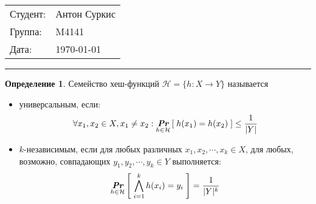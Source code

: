 \documentclass{article}
\begin{document}
    \theoremstyle{definition}
    \newtheorem*{definition}{Определение}
    \newtheorem{theorem}{Теорема}
    \newtheorem{statement}{Утверждение}
    \newtheorem{lemma}{Лемма}

    \newcommand{\N}{\mathbb{N}}
    \newcommand{\R}{\mathbb{R}_{>0}}
    \renewcommand{\O}{\mathcal{O}}
    \renewcommand{\o}{o}
    \newcommand{\Const}{\mathit{Const}}
    \newcommand{\Mod}{~\text{mod}~}
    \newcommand{\thus}{\Rightarrow}
    \renewcommand{\H}{\mathcal{H}}
    \newcommand{\Prb}[1]{\underset{#1}{\textit{\textbf{Pr}}}}

    \newcommand{\paren}[1]{\left ( #1 \right )}
    \newcommand{\brackets}[1]{\left [ #1 \right ]}
    \newcommand{\braces}[1]{\left \{ #1 \right \}}
    \newcommand{\floor}[1]{\left \lfloor #1 \right \rfloor}
    \newcommand{\ceil}[1]{\left \lceil #1 \right \rceil}
    \newcommand{\abs}[1]{\left | #1 \right |}

    \hfill
    \begin{tabular}{ll}
        Студент: & Антон Суркис \\
        Группа:  & M4141        \\
        Дата:    & \today       \\
    \end{tabular}
    \hrule

    \begin{definition} Семейство хеш-функций $\H = \{ h : X \rightarrow Y \}$ называется
        \begin{itemize}
            \item универсальным, если:
            $$\forall x_1, x_2 \in X, x_1 \neq x_2: \Prb{h \in \H}\left[ \; h(x_1) = h(x_2) \; \right] \le \frac{1}{|Y|}$$

            \item $k$-независимым, если
            для любых различных $x_1, x_2, \cdots, x_k \in X$, для любых, возможно, совпадающих $y_1, y_2, \cdots, y_k \in Y$
            выполняется:
            $$\Prb{h \in \H}\left[ \; \bigwedge_{i=1}^k h(x_i) = y_i \; \right] = \frac{1}{|Y|^k}$$
        \end{itemize}
    \end{definition}

    
%     
%     
    
%     
    
    
    
\end{document}
